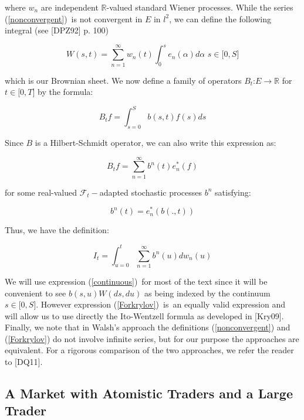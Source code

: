 \documentclass{article}
\begin{document}
where $w_{n}$ are independent $\mathbb{R}$-valued standard Wiener processes.
While the series (\ref{nonconvergent})\ is not convergent in $E$ in $l^{2}$,
we can define the following integral (see [DPZ92] p. 100)

\begin{equation*}
W(s,t)=\sum_{n=1}^{\infty }w_{n}(t)\int_{0}^{s}e_{n}(\alpha )d\alpha \text{
\ \ }s\in \lbrack 0,S]
\end{equation*}

which is our Brownian sheet. We now define a family of operators $B_{t}$:$%
E\rightarrow \mathbb{R}$ for $t\in \lbrack 0,T]$ by the formula:

\begin{equation*}
B_{t}f=\int_{s=0}^{S}b(s,t)f(s)ds
\end{equation*}

Since $B$ is a Hilbert-Schmidt operator, we can also write this expression
as:

\begin{equation*}
B_{t}f=\sum_{n=1}^{\infty }b^{n}(t)e_{n}^{\ast }(f)
\end{equation*}

for some real-valued $\mathcal{F}_{t}-$adapted stochastic processes $b^{n}$
satisfying:

\begin{equation*}
b^{n}(t)=e_{n}^{\ast }(b(.,t))
\end{equation*}

Thus, we have the definition:

\begin{equation}
I_{t}=\int_{u=0}^{t}\sum_{n=1}^{\infty }b^{n}(u)dw_{n}(u)  \label{Forkrylov}
\end{equation}

We will use expression (\ref{continuous})\ for most of the text since it
will be convenient to see $b(s,u)W(ds,du)$ as being indexed by the continuum 
$s\in \lbrack 0,S]$. However expression (\ref{Forkrylov})\ is\ an equally
valid expression and will allow us to use directly the Ito-Wentzell formula
as developed in [Kry09]. Finally, we note that in Walsh's approach the
definitions (\ref{nonconvergent}) and (\ref{Forkrylov}) do not involve
infinite series, but for our purpose the approaches are equivalent. For a
rigorous comparison of the two approaches, we refer the reader to [DQ11].

\bigskip

\subsection{A Market with Atomistic Traders and a Large Trader}
\end{document}
